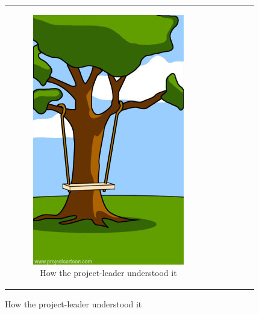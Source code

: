 \begin{figure}[h]
\begin{center}
\begin{tabular}{|c|c|c|c|c|c|}
\begin{subfigure}[t]{0.15\textwidth}\centering\includegraphics[width=0.9\columnwidth]{images/howunderstood}
\caption*{\tiny \centering How the project-leader understood it}\label{fig:howunderstood}\end{subfigure}&

\end{tabular}
\end{center}
\end{figure}
